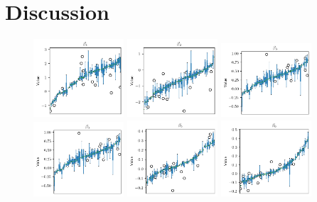 \section{Discussion}

\begin{figure}[h]
    \centering
    \includegraphics[width=0.3\textwidth]{files/beta_var/beta_1_var.png}
    \includegraphics[width=0.3\textwidth]{files/beta_var/beta_2_var.png}
    \includegraphics[width=0.3\textwidth]{files/beta_var/beta_3_var.png}
    \includegraphics[width=0.3\textwidth]{files/beta_var/beta_3_var.png}
    \includegraphics[width=0.3\textwidth]{files/beta_var/beta_5_var.png}
    \includegraphics[width=0.3\textwidth]{files/beta_var/beta_6_var.png}

\end{figure}
